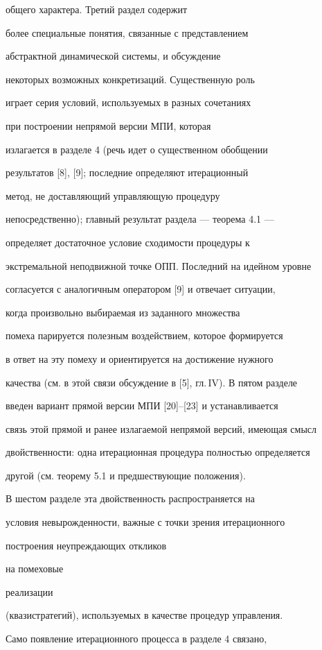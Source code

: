 общего характера. Третий раздел содержит


более специальные понятия, связанные с представлением


абстрактной динамической системы, и обсуждение


некоторых возможных конкретизаций. Существенную роль


играет серия условий, используемых в разных сочетаниях


при построении непрямой версии МПИ, которая


излагается в разделе 4 (речь идет о существенном обобщении


результатов [8], [9]; последние определяют итерационный


метод, не доставляющий управляющую процедуру


непосредственно); главный результат раздела --- теорема 4.1 ---


определяет достаточное условие сходимости процедуры к


экстремальной неподвижной точке ОПП. Последний на идейном уровне


согласуется с аналогичным оператором [9] и отвечает ситуации,


когда произвольно выбираемая из заданного множества


помеха парируется полезным воздействием, которое формируется


в ответ на эту помеху и ориентируется на достижение нужного


качества (см. в этой связи обсуждение в [5], гл.\,IV). В пятом разделе


введен вариант прямой версии МПИ [20]--[23] и устанавливается


связь этой прямой и ранее излагаемой непрямой версий, имеющая смысл


двойственности: одна итерационная процедура полностью определяется


другой (см. теорему 5.1 и предшествующие положения).


В шестом разделе эта двойственность распространяется на


условия невырожденности, важные с точки зрения итерационного


построения неупреждающих откликов


на помеховые


реализации


(квазистратегий), используемых в качестве процедур управления.


Само появление итерационного процесса в разделе 4 связано,


